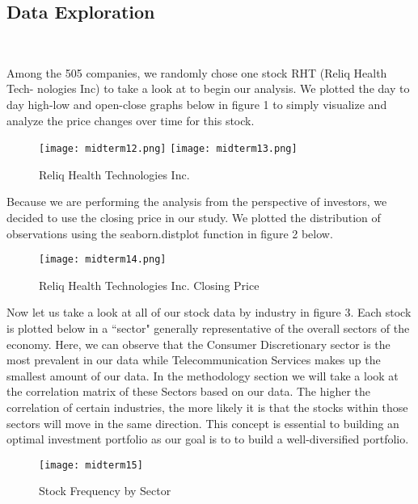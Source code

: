 \documentclass[11pt, oneside]{article}   	%
\begin{document}
\newpage

\subsection{Data Exploration} \

Among the 505 companies, we randomly chose one stock RHT (Reliq Health Tech- nologies Inc) to take a look at to begin our analysis. We plotted the day to day high-low and open-close graphs below in figure 1 to simply visualize and analyze the price changes over time for this stock.

\begin{figure}[htbp] %
   \centering
   \texttt{[image: midterm12.png]} 
   \texttt{[image: midterm13.png]} 
   \caption{Reliq Health Technologies Inc.}
\end{figure}

\FloatBarrier

Because we are performing the analysis from the perspective of investors, we decided to use the closing price in our study. We plotted the distribution of observations using the seaborn.distplot function in figure 2 below.

\begin{figure}[h] %
   \centering
   \texttt{[image: midterm14.png]} 
   \caption{Reliq Health Technologies Inc. Closing Price}
\end{figure}

\newpage
Now let us take a look at all of our stock data by industry in figure 3. Each stock is plotted below in a “sector" generally representative of the overall sectors of the economy. Here, we can observe that the Consumer Discretionary sector is the most prevalent in our data while Telecommunication Services makes up the smallest amount of our data. In the methodology section we will take a look at the correlation matrix of these Sectors based on our data. The higher the correlation of certain industries, the more likely it is that the stocks within those sectors will move in the same direction. This concept is essential to building an optimal investment portfolio as our goal is to to build a well-diversified portfolio. 

\begin{figure}[!h] %
   \centering
   \texttt{[image: midterm15]} 
   \caption{Stock Frequency by Sector}
   \label{fig:example}
\end{figure} 
\end{document}
